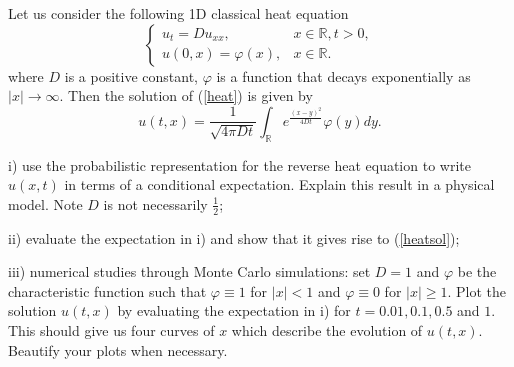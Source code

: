 \problem
\begin{question}
    Let us consider the following 1D classical heat equation
    \begin{equation}\label{heat}
    \left\{
    \begin{array}{ll}
    u_t=Du_{xx},& x\in \mathbb R, t>0, \\
    u(0,x)=\varphi(x),& x\in \mathbb R.
    \end{array}
    \right.
    \end{equation}
    where $D$ is a positive constant, $\varphi$ is a function that decays exponentially as $|x|\rightarrow \infty$.  Then the solution of (\ref{heat}) is given by
    \begin{equation}\label{heatsol}
    u(t,x)=\frac{1}{\sqrt{4\pi Dt}}\int_{\mathbb R} e^{\frac{(x-y)^2}{4Dt}}\varphi(y) dy.
    \end{equation}

    i) use the probabilistic representation for the reverse heat equation to write $u(x,t)$ in terms of a conditional expectation.  Explain this result in a physical model.  Note $D$ is not necessarily $\frac{1}{2}$;

    ii) evaluate the expectation in i) and show that it gives rise to (\ref{heatsol});

    iii) numerical studies through Monte Carlo simulations: set $D=1$ and $\varphi$ be the characteristic function such that $\varphi\equiv 1$ for $|x|<1$ and $\varphi\equiv0$ for $|x|\geq1$.  Plot the solution $u(t,x)$ by evaluating the expectation in i) for $t=0.01,0.1, 0.5$ and $1$.  This should give us four curves of $x$ which describe the evolution of $u(t,x)$.  Beautify your plots when necessary.
\end{question}
